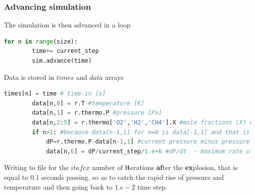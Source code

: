 \documentclass[a4paper]{article}
\begin{document}
\subsubsection{Advancing simulation}
The simulation is then advanced in a loop
\begin{lstlisting}[language=python]
    for n in range(size):
        time+= current_step
        sim.advance(time)
\end{lstlisting}
Data is stored in $times$ and $data$ arrays
\begin{lstlisting}[language=python]
        times[n] = time # time in [s]
        data[n,0] = r.T #temperature [K]
        data[n,1] = r.thermo.P #pressure [Pa]
        data[n,2:5] = r.thermo['O2','H2','CH4'].X #mole fractions (X) of O2, H and CH4 [%]
        if n>1: #because data[n-1,1] for n=0 is data[-1,1] and that is impossible
            dP=r.thermo.P-data[n-1,1] #current pressure minus pressure from previous iteration, in [Pa]
            data[n,6] = dP/current_step/1.e+6 #dP/dt  - maximum rate of pressure rise in [Mpa/s]
\end{lstlisting}
Writing to file for the $itafex$ number of \textbf{it}erations \textbf{af}ter the \textbf{ex}plosion, that is equal to 0.1 seconds passing, so as to catch the rapid rise of pressure and temperature and then going back to $ 1.e-2$ time step.
\end{document}
